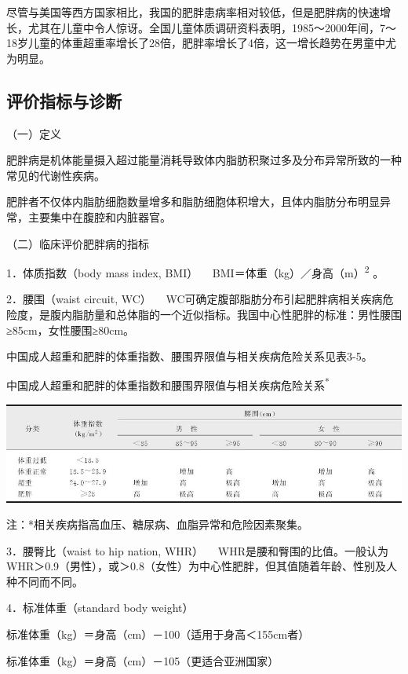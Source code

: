 尽管与美国等西方国家相比，我国的肥胖患病率相对较低，但是肥胖病的快速增长，尤其在儿童中令人惊讶。全国儿童体质调研资料表明，1985～2000年间，7～18岁儿童的体重超重率增长了28倍，肥胖率增长了4倍，这一增长趋势在男童中尤为明显。

\hypertarget{text00004.htmlux5cux23mllj12}{%
\subsection{评价指标与诊断}\label{text00004.htmlux5cux23mllj12}}

（一）定义

肥胖病是机体能量摄入超过能量消耗导致体内脂肪积聚过多及分布异常所致的一种常见的代谢性疾病。

肥胖者不仅体内脂肪细胞数量增多和脂肪细胞体积增大，且体内脂肪分布明显异常，主要集中在腹腔和内脏器官。

（二）临床评价肥胖病的指标

{1．体质指数（body mass index, BMI）}
　BMI＝体重（kg）／身高（m）\textsuperscript{2} 。

{2．腰围（waist circuit, WC）}
　WC可确定腹部脂肪分布引起肥胖病相关疾病危险度，是腹内脂肪量和总体脂的一个近似指标。我国中心性肥胖的标准：男性腰围≥85cm，女性腰围≥80cm。

中国成人超重和肥胖的体重指数、腰围界限值与相关疾病危险关系见表3-5。

\begin{table}[htbp]
\centering
\caption{中国成人超重和肥胖的体重指数和腰围界限值与相关疾病危险关系\textsuperscript{*}}
\label{tab3-5}
\includegraphics{./images/Image00020.jpg}
\end{table}

注：*相关疾病指高血压、糖尿病、血脂异常和危险因素聚集。

{3．腰臀比（waist to hip nation, WHR）}
　WHR是腰和臀围的比值。一般认为WHR＞0.9（男性），或＞0.8（女性）为中心性肥胖，但其值随着年龄、性别及人种不同而不同。

{4．标准体重（standard body weight）}

标准体重（kg）＝身高（cm）－100（适用于身高＜155cm者）

标准体重（kg）＝身高（cm）－105（更适合亚洲国家）

